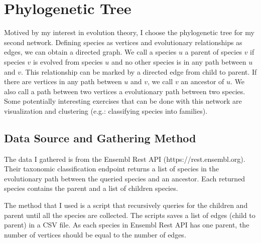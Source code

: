 \documentclass[12pt]{article}
\begin{document}
\section{Phylogenetic Tree}

Motived by my interest in evolution theory, I choose the phylogenetic tree for my second network. Defining species as vertices and evolutionary relationships as edges, we can obtain a directed graph. We call a species $u$ a parent of species $v$ if species $v$ is evolved from species $u$ and no other species is in any path between $u$ and $v$. This relationship can be marked by a directed edge from child to parent. If there are vertices in any path between $u$ and $v$, we call $v$ an ancestor of $u$. We also call a path between two vertices a evolutionary path between two species. Some potentially interesting exercises that can be done with this network are visualization and clustering (e.g.: classifying species into families). 

\subsection{Data Source and Gathering Method}

The data I gathered is from the Ensembl Rest API (https://rest.ensembl.org). Their taxonomic classification endpoint returns a list of species in the evolutionary path between the queried species and an ancestor. Each returned species contains the parent and a list of children species.

The method that I used is a script that recursively queries for the children and parent until all the species are collected. The scripts saves a list of edges (child to parent) in a CSV file. As each species in Ensembl Rest API has one parent, the number of vertices should be equal to the number of edges. 
\end{document}
